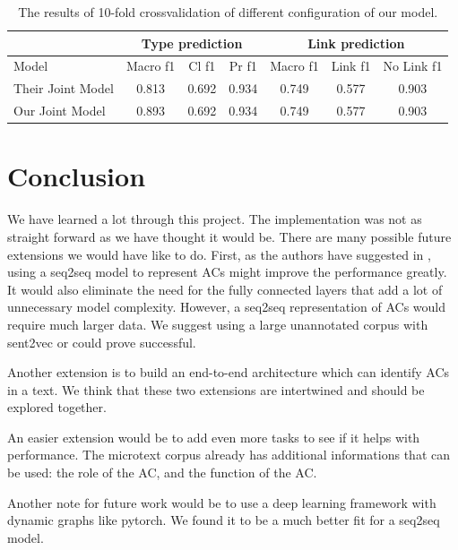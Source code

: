 \documentclass[onecolumn]{article}
\begin{document}
\begin{table}[h]
    \centering
    \caption{The results of 10-fold crossvalidation of different configuration of our model.}
    \label{tab:label}
    \begin{tabular}{ | l || c | c | c | c | c | c | }
            \hline
            & \multicolumn{3}{|c|}{Type prediction} & \multicolumn{3}{|c|}{Link prediction} \\ 
            \hline
            Model & Macro f1 & Cl f1 & Pr f1 & Macro f1 & Link f1 & No Link f1 \\
            \hline
            Their Joint Model & 0.813 & 0.692 & 0.934 & 0.749 & 0.577 & 0.903 \\
            Our Joint Model   & 0.893 & 0.692 & 0.934 & 0.749 & 0.577 & 0.903 \\
    \end{tabular}
\end{table}

\section{Conclusion}
We have learned a lot through this project.
The implementation was not as straight forward as we have thought it would be.
There are many possible future extensions we would have like to do.
First, as the authors have suggested in \cite{potash2017here}, using a seq2seq model to represent ACs might improve the performance greatly.
It would also eliminate the need for the fully connected layers that add a lot of unnecessary model complexity.
However, a seq2seq representation of ACs would require much larger data.
We suggest using a large unannotated corpus with sent2vec or \cite{sent} could prove successful.

Another extension is to build an end-to-end architecture which can identify ACs in a text.
We think that these two extensions are intertwined and should be explored together.

An easier extension would be to add even more tasks to see if it helps with performance.
The microtext corpus already has additional informations that can be used: the role of the AC, and the function of the AC.

Another note for future work would be to use a deep learning framework with dynamic graphs like pytorch.
We found it to be a much better fit for a seq2seq model.

\nocite{*}


\end{document}
